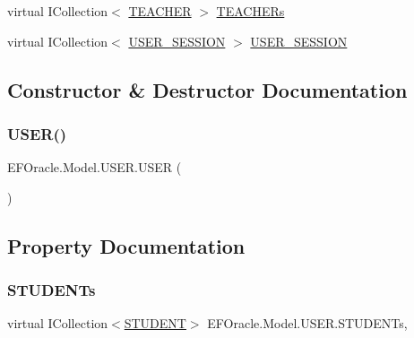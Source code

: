 \begin{DoxyCompactItemize}
\item 
virtual I\+Collection$<$ \hyperlink{class_e_f_oracle_1_1_model_1_1_t_e_a_c_h_e_r}{T\+E\+A\+C\+H\+ER} $>$ \hyperlink{class_e_f_oracle_1_1_model_1_1_u_s_e_r_a3326de9bfa91577cf2e251ed9d20ae7b}{T\+E\+A\+C\+H\+E\+Rs}
\item 
virtual I\+Collection$<$ \hyperlink{class_e_f_oracle_1_1_model_1_1_u_s_e_r___s_e_s_s_i_o_n}{U\+S\+E\+R\+\_\+\+S\+E\+S\+S\+I\+ON} $>$ \hyperlink{class_e_f_oracle_1_1_model_1_1_u_s_e_r_aaffe4688e7551402b754435df6369ffe}{U\+S\+E\+R\+\_\+\+S\+E\+S\+S\+I\+ON}
\end{DoxyCompactItemize}


\subsection{Constructor \& Destructor Documentation}
\mbox{\label{class_e_f_oracle_1_1_model_1_1_u_s_e_r_a72a8423da1625bbd96ebf3e256e2e69d}} 
\subsubsection{\texorpdfstring{U\+S\+E\+R()}{USER()}}
{\footnotesize\ttfamily E\+F\+Oracle.\+Model.\+U\+S\+E\+R.\+U\+S\+ER (\begin{DoxyParamCaption}{ }\end{DoxyParamCaption})}



\subsection{Property Documentation}
\mbox{\label{class_e_f_oracle_1_1_model_1_1_u_s_e_r_a4f9c5bb7b6fff133bd167b6f9e7ce81c}} 
\subsubsection{\texorpdfstring{S\+T\+U\+D\+E\+N\+Ts}{STUDENTs}}
{\footnotesize\ttfamily virtual I\+Collection$<$\hyperlink{class_e_f_oracle_1_1_model_1_1_s_t_u_d_e_n_t}{S\+T\+U\+D\+E\+NT}$>$ E\+F\+Oracle.\+Model.\+U\+S\+E\+R.\+S\+T\+U\+D\+E\+N\+Ts\hspace{0.3cm}{\ttfamily [get]}, {\ttfamily [set]}}

